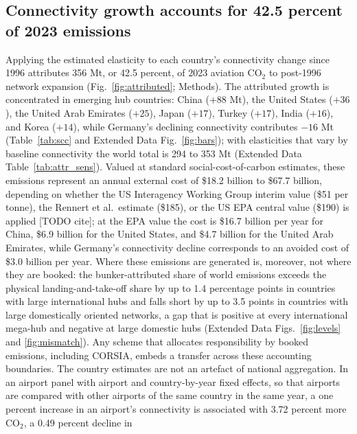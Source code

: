\documentclass[12pt]{article}
\begin{document}
\begin{table}[H]
{\begin{threeparttable}
\begin{tablenotes}[flushleft]
\end{tablenotes}
\end{threeparttable}}
\end{table}

\subsection*{Connectivity growth accounts for 42.5 percent of 2023
emissions}
Applying the estimated elasticity to each country's connectivity change
since 1996 attributes 356 Mt, or 42.5 percent, of 2023 aviation CO$_2$ to
post-1996 network expansion (Fig.~\ref{fig:attributed}; Methods). The
attributed growth is concentrated in emerging hub countries: China
($+88$ Mt), the United States ($+36$), the United Arab Emirates ($+25$),
Japan ($+17$), Turkey ($+17$), India ($+16$), and Korea ($+14$), while
Germany's declining connectivity contributes $-16$ Mt (Table~\ref{tab:scc} and Extended Data Fig.~\ref{fig:bars}); with elasticities that vary by baseline connectivity the world total is 294 to 353 Mt (Extended Data Table~\ref{tab:attr_sens}). Valued at standard social-cost-of-carbon estimates,
these emissions represent an annual external cost of \$18.2 billion to
\$67.7 billion, depending on whether the US Interagency Working Group
interim value (\$51 per tonne), the Rennert et al.\ estimate (\$185), or
the US EPA central value (\$190) is applied [TODO cite]; at the EPA value
the cost is \$16.7 billion per year for China, \$6.9 billion for the
United States, and \$4.7 billion for the United Arab Emirates, while
Germany's connectivity decline corresponds to an avoided cost of \$3.0
billion per year. Where these
emissions are generated is, moreover, not where they are booked: the
bunker-attributed share of world emissions exceeds the physical
landing-and-take-off share by up to 1.4 percentage points in countries
with large international hubs and falls short by up to 3.5 points in
countries with large domestically oriented networks, a gap that is
positive at every international mega-hub and negative at large domestic
hubs (Extended Data Figs.~\ref{fig:levels} and \ref{fig:mismatch}). Any scheme that allocates
responsibility by booked emissions, including CORSIA, embeds a transfer
across these accounting boundaries. The country estimates are not an artefact of national aggregation.
In an airport panel with airport and country-by-year fixed effects, so
that airports are compared with other airports of the same country in the
same year, a one percent increase in an airport's connectivity is
associated with 3.72 percent more CO$_2$, a 0.49 percent decline in
\end{document}

